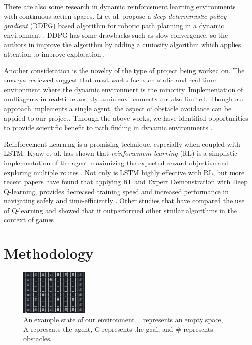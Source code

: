 \documentclass[conference]{IEEEtran}
\begin{document}
There are also some research in dynamic reinforcement learning environments with
continuous action spaces. Li et al. propose a \textit{deep deterministic policy
    gradient} (DDPG) based algorithm for robotic path planning in a dynamic
environment \cite{li_research_2021}. DDPG has some drawbacks such as slow
convergence, so the authors in \cite{li_research_2021} improve the algorithm by
adding a curiosity algorithm which applies attention to improve exploration
\cite{reizinger_attention_2020}.

Another consideration is the novelty of the type of project being worked on. The
surveys reviewed suggest that most works focus on static and real-time
environment where the dynamic environment is the minority. Implementation of
multiagents in real-time and dynamic environments are also limited. Though our
approach implements a single agent, the aspect of obstacle avoidance can be
applied to our project. Through the above works, we have identified
opportunities to provide scientific benefit to path finding in dynamic
environments \cite{abd_algfoor_comprehensive_2015}.

Reinforcement Learning is a promising technique, especially when coupled with
LSTM. Kyaw et al. has shown that \textit{reinforcement learning} (RL) is a
simplistic implementation of the agent maximizing the expected reward objective
and exploring multiple routes \cite{kyaw_coverage_2020}. Not only is LSTM highly
effective with RL, but more recent papers have found that applying RL and Expert
Demonstration with Deep Q-learning, provides decreased training speed and
increased performance in navigating safely and time-efficiently
\cite{liu_improved_2021}. Other studies that have compared the use of
Q-learning and showed that it outperformed other similar algorithms in the
context of games \cite{hester_deep_2017}.

\section{Methodology}

\begin{figure}
    \centering
    \includegraphics[width=0.3\textwidth]{assets/environment.png}
    \caption{An example state of our environment. $\_$ represents an empty
        space, A represents the agent, G represents the goal, and $\#$
        represents obstacles.}
    \label{fig:path_planning_methodology}
\end{figure}
\end{document}
